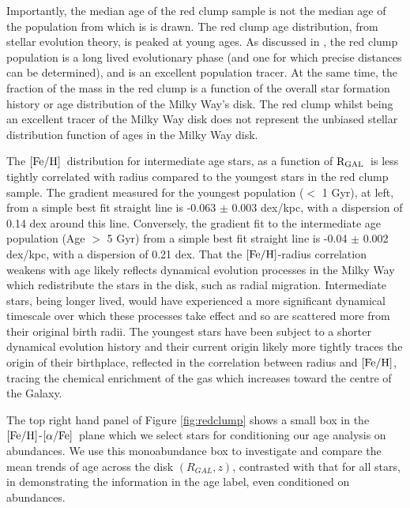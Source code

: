 \documentclass[12pt, preprint]{aastex}
\newcommand{\feh}{\mbox{$\rm [Fe/H]$}}
\newcommand{\alphafe}{\mbox{$\rm [\alpha/Fe]$}}
\newcommand{\rgal}{\mbox{$\rm R_{GAL}$}}
\begin{document}
Importantly, the median age of the red clump sample is not the median age of the population from which is is drawn. The red clump age distribution, from stellar evolution theory, is peaked at young ages. As discussed in \citet{Bovy2014}, the red clump population is a long lived evolutionary phase (and one for which precise distances can be determined), and is an excellent population tracer. At the same time, the fraction of the mass in the red clump is a function of the overall star formation history or age distribution of the Milky Way's disk.  The red clump whilst being an excellent tracer of the Milky Way disk does not represent the unbiased stellar distribution function of ages in the Milky Way disk. 

The \feh\ distribution for intermediate age stars, as a function of \rgal\ is less tightly correlated with radius compared to the youngest stars in the red clump sample. The gradient measured for the youngest population ($<$ 1 Gyr), at left, from a simple best fit straight line is -0.063 $\pm$ 0.003 dex/kpc, with a dispersion of 0.14 dex around this line. Conversely, the gradient fit to the intermediate age population (Age $>$ 5 Gyr) from a simple best fit straight line is -0.04 $\pm$ 0.002 dex/kpc, with a dispersion of 0.21 dex. That the \feh-radius correlation weakens with age likely reflects dynamical evolution processes in the Milky Way which redistribute the stars in the disk, such as radial migration. Intermediate stars, being longer lived, would have experienced a more significant dynamical timescale over which these processes take effect and so are scattered more from their original birth radii.  The youngest stars have been subject to a shorter dynamical evolution history and their current origin likely more tightly traces the origin of their birthplace, reflected in the correlation between radius and \feh, tracing the chemical enrichment of the gas which increases toward the centre of the Galaxy.  

The top right hand panel of Figure \ref{fig:redclump} shows a small box in the \feh-\alphafe\ plane which we select stars for conditioning our age analysis on abundances. We use this monoabundance box to investigate and compare the mean trends of age across the disk $(R_{GAL},z)$, contrasted with that for all stars, in demonstrating the information in the age label, even conditioned on abundances. 
\end{document}

